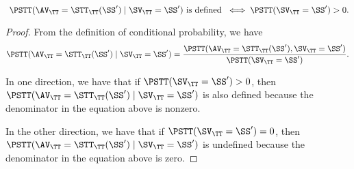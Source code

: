 \begin{proposition}
  $$\text{ 
  $
  \PSTT(\AV_\TT = \STT_\TT(\SS') \mid \SV_\TT = \SS')$
  is defined } 
  \iff 
  \PSTT(\SV_{\TT} = \SS') > 0
  .$$%
\end{proposition}

\begin{proof}
  From the definition of conditional probability, we have
  $$ 
  \PSTT(\AV_\TT = \STT_\TT(\SS') \mid \SV_\TT = \SS')
  = 
  \frac
  {\PSTT(\AV_\TT = \STT_\TT(\SS'), \SV_\TT = \SS')}
  {\PSTT(\SV_\TT = \SS')}.$$

  In one direction, we have that if $\PSTT(\SV_\TT = \SS') > 0$, then 
  $ \PSTT(\AV_\TT = \STT_\TT(\SS') \mid \SV_\TT = \SS') $
  is also defined because the denominator in the equation above is nonzero.

  In the other direction, we have that if $\PSTT(\SV_\TT = \SS') = 0$, then 
  $ \PSTT(\AV_\TT = \STT_\TT(\SS') \mid \SV_\TT = \SS') $
  is undefined because the denominator in the equation above is zero.
\end{proof}
